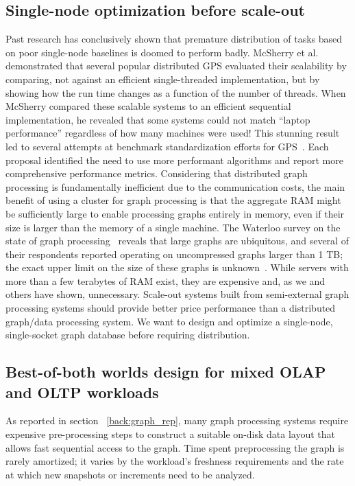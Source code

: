 \subsection{Single-node optimization before scale-out}
Past research has conclusively shown that premature distribution of tasks based on poor single-node baselines is doomed to perform badly.
McSherry et al.~\cite{mcsherry2015scalability} demonstrated that several popular distributed GPS evaluated their scalability by comparing, not against an efficient single-threaded implementation, but by showing how the run time changes as a function of the number of threads.
When McSherry compared these scalable systems to an efficient sequential implementation, he revealed that some systems could not match ``laptop performance'' regardless of how many machines were used!
This stunning result led to several attempts at benchmark standardization efforts for GPS~\cite{capotua2015graphalytics,mehrotra2024sok,beamer2015gap,graph500}. Each proposal identified the need to use more performant algorithms and report more comprehensive performance metrics.
Considering that distributed graph processing is fundamentally inefficient due to the communication costs, the main benefit of using a cluster for graph processing is that the aggregate RAM might be sufficiently large to enable processing graphs entirely in memory, even if their size is larger than the memory of a single machine.
The Waterloo survey on the state of graph processing~\cite{ubiquityLargeGraphsVLDB2017} reveals that large graphs are ubiquitous, and several of their respondents reported operating on uncompressed graphs larger than 1 TB; the exact upper limit on the size of these graphs is unknown~\cite[Section~3.2]{ubiquityLargeGraphsVLDB2017}.
While servers with more than a few terabytes of RAM exist, they are expensive and, as we and others have shown, unnecessary.
Scale-out systems built from semi-external graph processing systems should provide better price performance than a distributed graph/data processing system.
We want to design and optimize a single-node, single-socket graph database before requiring distribution.

\subsection{Best-of-both worlds design for mixed OLAP and OLTP workloads}
As reported in section ~\ref{back:graph_rep}, many graph processing systems require expensive pre-processing steps to construct a suitable on-disk data layout that allows fast sequential access to the graph.
Time spent preprocessing the graph is rarely amortized; it varies by the workload's freshness requirements and the rate at which new snapshots or increments need to be analyzed.

